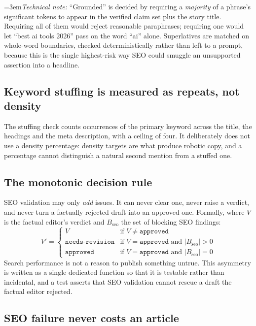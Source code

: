\documentclass[11pt,a4paper]{article}
\newcommand{\technote}[1]{\par\vspace{-0.25em}\begingroup\footnotesize\color{aitkGray}\sloppy\emergencystretch=3em\textit{Technical note:} #1\par\endgroup}
\begin{document}
\technote{``Grounded'' is decided by requiring a \emph{majority} of a phrase's
significant tokens to appear in the verified claim set plus the story title.
Requiring all of them would reject reasonable paraphrases; requiring one would let
``best ai tools 2026'' pass on the word ``ai'' alone. Superlatives are matched on
whole-word boundaries, checked deterministically rather than left to a prompt,
because this is the single highest-risk way SEO could smuggle an unsupported
assertion into a headline.}

\subsection{Keyword stuffing is measured as repeats, not density}

The stuffing check counts occurrences of the primary keyword across the title,
the headings and the meta description, with a ceiling of four. It deliberately
does not use a density percentage: density targets are what produce robotic copy,
and a percentage cannot distinguish a natural second mention from a stuffed one.

\subsection{The monotonic decision rule}

\begin{blockbox}
SEO validation may only \emph{add} issues. It can never clear one, never raise a
verdict, and never turn a factually rejected draft into an approved one.
Formally, where $V$ is the factual editor's verdict and $B_{\text{seo}}$ the set
of blocking SEO findings:
\[
V' =
\begin{cases}
V & \text{if } V \neq \texttt{approved} \\[0.25em]
\texttt{needs-revision} & \text{if } V = \texttt{approved} \text{ and } |B_{\text{seo}}| > 0 \\[0.25em]
\texttt{approved} & \text{if } V = \texttt{approved} \text{ and } |B_{\text{seo}}| = 0
\end{cases}
\]
Search performance is not a reason to publish something untrue. This asymmetry is
written as a single dedicated function so that it is testable rather than
incidental, and a test asserts that SEO validation cannot rescue a draft the
factual editor rejected.
\end{blockbox}

\subsection{SEO failure never costs an article}
\end{document}

